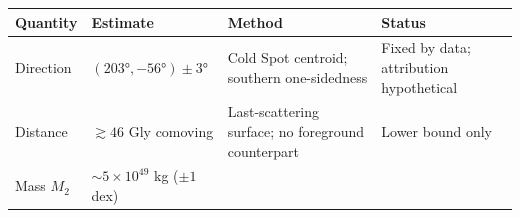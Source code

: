 \documentclass[
]{article}
\begin{document}
\begin{longtable}[]{@{}llll@{}}
\toprule
\begin{minipage}[b]{0.22\columnwidth}\raggedright
Quantity\strut
\end{minipage} & \begin{minipage}[b]{0.22\columnwidth}\raggedright
Estimate\strut
\end{minipage} & \begin{minipage}[b]{0.22\columnwidth}\raggedright
Method\strut
\end{minipage} & \begin{minipage}[b]{0.22\columnwidth}\raggedright
Status\strut
\end{minipage}\tabularnewline
\midrule
\endhead
\begin{minipage}[t]{0.22\columnwidth}\raggedright
Direction\strut
\end{minipage} & \begin{minipage}[t]{0.22\columnwidth}\raggedright
\((203°, -56°) \pm 3°\)\strut
\end{minipage} & \begin{minipage}[t]{0.22\columnwidth}\raggedright
Cold Spot centroid; southern one-sidedness\strut
\end{minipage} & \begin{minipage}[t]{0.22\columnwidth}\raggedright
Fixed by data; attribution hypothetical\strut
\end{minipage}\tabularnewline
\begin{minipage}[t]{0.22\columnwidth}\raggedright
Distance\strut
\end{minipage} & \begin{minipage}[t]{0.22\columnwidth}\raggedright
\(\gtrsim 46\) Gly comoving\strut
\end{minipage} & \begin{minipage}[t]{0.22\columnwidth}\raggedright
Last-scattering surface; no foreground counterpart\strut
\end{minipage} & \begin{minipage}[t]{0.22\columnwidth}\raggedright
Lower bound only\strut
\end{minipage}\tabularnewline
\begin{minipage}[t]{0.22\columnwidth}\raggedright
Mass \(M_2\)\strut
\end{minipage} & \begin{minipage}[t]{0.22\columnwidth}\raggedright
\(\sim\!5\times10^{49}\) kg (\(\pm 1\) dex)\strut
\end{minipage} & \begin{minipage}[t]{0.22\columnwidth}\raggedright

\end{minipage}
\end{longtable}
\end{document}
